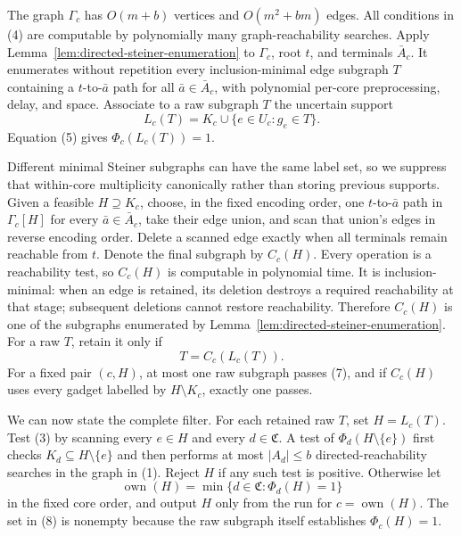 The graph \(\Gamma_c\) has \(O(m+b)\) vertices and \(O(m^2+bm)\) edges.  All conditions in (4) are computable by polynomially many graph-reachability searches.  Apply Lemma~\ref{lem:directed-steiner-enumeration} to \(\Gamma_c\), root \(t\), and terminals \(\bar A_c\).  It enumerates without repetition every inclusion-minimal edge subgraph \(T\) containing a \(t\)-to-\(\bar a\) path for all \(\bar a\in\bar A_c\), with polynomial per-core preprocessing, delay, and space.  Associate to a raw subgraph \(T\) the uncertain support
\[
 L_c(T)=K_c\cup\{e\in U_c:g_e\in T\}.
 \tag{6}
\]
Equation (5) gives \(\Phi_c(L_c(T))=1\).

Different minimal Steiner subgraphs can have the same label set, so we suppress that within-core multiplicity canonically rather than storing previous supports.  Given a feasible \(H\supseteq K_c\), choose, in the fixed encoding order, one \(t\)-to-\(\bar a\) path in \(\Gamma_c[H]\) for every \(\bar a\in\bar A_c\), take their edge union, and scan that union's edges in reverse encoding order.  Delete a scanned edge exactly when all terminals remain reachable from \(t\).  Denote the final subgraph by \(C_c(H)\).  Every operation is a reachability test, so \(C_c(H)\) is computable in polynomial time.  It is inclusion-minimal: when an edge is retained, its deletion destroys a required reachability at that stage; subsequent deletions cannot restore reachability.  Therefore \(C_c(H)\) is one of the subgraphs enumerated by Lemma~\ref{lem:directed-steiner-enumeration}.  For a raw \(T\), retain it only if
\[
 T=C_c(L_c(T)).
 \tag{7}
\]
For a fixed pair \((c,H)\), at most one raw subgraph passes (7), and if \(C_c(H)\) uses every gadget labelled by \(H\setminus K_c\), exactly one passes.

We can now state the complete filter.  For each retained raw \(T\), set \(H=L_c(T)\).  Test (3) by scanning every \(e\in H\) and every \(d\in\mathfrak C\).  A test of \(\Phi_d(H\setminus\{e\})\) first checks \(K_d\subseteq H\setminus\{e\}\) and then performs at most \(|A_d|\le b\) directed-reachability searches in the graph in (1).  Reject \(H\) if any such test is positive.  Otherwise let
\[
 \operatorname{own}(H)=\min\{d\in\mathfrak C:\Phi_d(H)=1\}
 \tag{8}
\]
in the fixed core order, and output \(H\) only from the run for \(c=\operatorname{own}(H)\).  The set in (8) is nonempty because the raw subgraph itself establishes \(\Phi_c(H)=1\).

